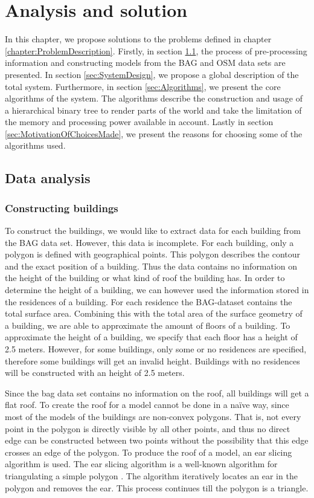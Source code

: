 \chapter{Analysis and solution}
\label{chap:AnalysisAndSolution}
In this chapter, we propose solutions to the problems defined in chapter \ref{chapter:ProblemDescription}. Firstly, in section \ref{sec:DataAnalysis}, the process of pre-processing information and constructing models from the BAG and OSM data sets are presented. In section \ref{sec:SystemDesign}, we propose a global description of the total system. Furthermore, in section \ref{sec:Algorithms}, we present the core algorithms of the system. The algorithms describe the construction and usage of a hierarchical binary tree to render parts of the world and take the limitation of the memory and processing power available in account. Lastly in section \ref{sec:MotivationOfChoicesMade}, we present the reasons for choosing some of the algorithms used.

\section{Data analysis}
\label{sec:DataAnalysis}
\subsection{Constructing buildings}
To construct the buildings, we would like to extract data for each building from the BAG data set. However, this data is incomplete. For each building, only a polygon is defined with geographical points. This polygon describes the contour and the exact position of a building. Thus the data contains no information on the height of the building or what kind of roof the building has. In order to determine the height of a building, we can however used the information stored in the residences of a building. For each residence the BAG-dataset contains the total surface area. Combining this with the total area of the surface geometry of a building, we are able to approximate the amount of floors of a building. To approximate the height of a building, we specify that each floor has a height of 2.5 meters. However, for some buildings, only some or no residences are specified, therefore some buildings will get an invalid height. Buildings with no residences will be constructed with an height of 2.5 meters.

Since the bag data set contains no information on the roof, all buildings will get a flat roof. To create the roof for a model cannot be done in a naïve way, since most of the models of the buildings are non-convex polygons. That is, not every point in the polygon is directly visible by all other points, and thus no direct edge can be constructed between two points without the possibility that this edge crosses an edge of the polygon. To produce the roof of a model, an ear slicing algorithm is used. The ear slicing algorithm is a well-known algorithm for triangulating a simple polygon \cite{Kajak11}. The algorithm iteratively locates an ear in the polygon and removes the ear. This process continues till the polygon is a triangle.

